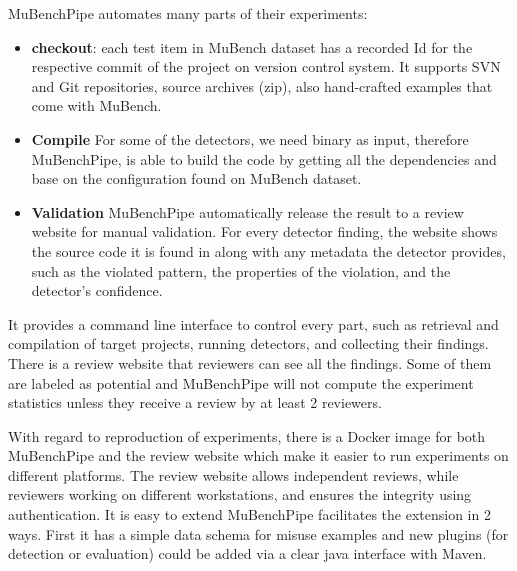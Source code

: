 \documentclass[authoryear,preprint]{sigplanconf}
\begin{document}
MuBenchPipe automates many parts of their experiments:
\begin{itemize}
	\item \textbf{checkout}: each test item in MuBench dataset has a recorded Id for the respective commit of the project on version control system. It supports SVN and Git repositories, source archives (zip), also hand-crafted examples that come with MuBench.
	\item \textbf{Compile} For some of the detectors, we need binary as input, therefore MuBenchPipe, is able to build the code by getting all the dependencies and base on the configuration found on MuBench dataset. 
	\item \textbf{Validation} MuBenchPipe automatically release the result to a review website for manual validation. For every detector finding, the website shows the source code it is found in along with any metadata the detector provides, such as the violated pattern, the properties of the violation, and the detector’s confidence\cite{8338426}.
\end{itemize}

It provides a command line interface to control every part, such as retrieval and compilation of target projects, running detectors, and collecting their findings. There is a review website that reviewers can see all the findings. Some of them are labeled as potential and MuBenchPipe will not compute the experiment statistics unless they receive a review by at least 2 reviewers. 

With regard to reproduction of experiments, there is a Docker image for both MuBenchPipe and the review website which make it easier to run experiments on different platforms. The review website allows independent reviews, while reviewers working on different workstations, and ensures the integrity using authentication. It is easy to extend MuBenchPipe facilitates the extension in 2 ways. First it has a simple data schema for misuse examples and new plugins (for detection or evaluation) could be added via a clear java interface with Maven. 
\end{document}
